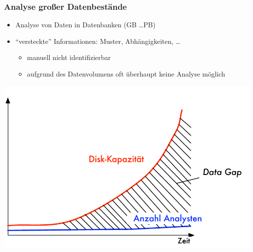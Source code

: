 

\begin{frame}
\frametitle{Analyse großer Datenbestände}

\begin{itemize}
\item Analyse von Daten in Datenbanken (GB \dots PB)
\item "`versteckte"' Informationen: Muster, Abhängigkeiten, \dots
\begin{itemize}
\item manuell nicht identifizierbar
\item aufgrund des Datenvolumens oft überhaupt keine Analyse möglich
\end{itemize}
\end{itemize}


\begin{center}
\includegraphics[scale=.45]{fig1/data-gap.pdf}
\end{center}

\end{frame}


